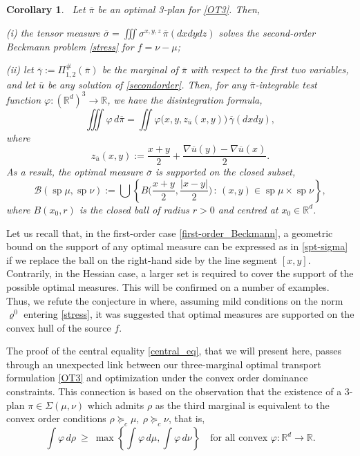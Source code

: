 \documentclass[11pt,letterpaper,reqno]{amsart}
\newtheorem{corollary}[theorem]{Corollary}
\theoremstyle{definition}
\numberwithin{equation}{section}
\newcommand{\med}{\medskip\noindent}
\newcommand{\R}{\mathbb{R}}
\newcommand{\Rd}{\R^d}
\newcommand{\ov}{\overline}
\newcommand{\B}{\mathcal{B}}
\DeclareMathOperator{\spt}{sp}
\begin{document}
\begin{corollary}\label{coro1-intro}\  Let $\ov \pi$ be an optimal 3-plan for \eqref{OT3}. Then,

\med (i) the tensor measure $\ov\sigma = \iiint \sigma^{x,y,z} \, \ov\pi(dxdydz)$ solves the second-order Beckmann problem \eqref{stress} for $f=\nu-\mu$;

\med (ii) let {$\ov\gamma:= \Pi_{1,2}^\#(\ov{\pi})$} be the marginal of $\ov\pi$ with respect to the first two variables, and let $\ov u$
be any solution of \eqref{secondorder}. Then, for any {$\ov\pi$-integrable} test function $\varphi: (\Rd)^3\to \R$,  we have the disintegration formula,
$$  \iiint \varphi \,  d\ov\pi =  \iint \varphi\big(x,y, z_{\ov u}(x,y)\big) \, \ov\gamma(dxdy),$$
where
\begin{equation}\label{zbar}
  z_{\ov u}(x,y) := \frac{x+y}{2} + \frac{\nabla \ov u(y)-\nabla \ov u(x)}{2}.
  \end{equation}
  As a result, the optimal measure $\ov\sigma$ is supported on the closed subset,
  \begin{equation}\label{spt-sigma}
\B(\spt \mu, \spt \nu) := \bigcup \left\{ B\Big(\frac{x+y}{2}, \frac{|x-y|}{2}\Big)\,:\, (x,y)\in \spt\mu \times \spt \nu\right\},
  \end{equation}
  where $B(x_0,r)$ is the closed ball of radius $r>0$ and centred at $x_0\in \Rd$.
  
\end{corollary}


Let us recall that, in the first-order case \eqref{first-order_Beckmann}, a geometric bound on the support of any optimal measure can be expressed as in  \eqref{spt-sigma} if we replace the ball on the right-hand side by the line segment $[x,y]$. Contrarily, in the Hessian case, a larger set is required  to cover the support of the possible optimal measures. This will be confirmed on a number of examples.
 Thus, we refute the conjecture in  \cite{bouchitte2007} where, assuming mild conditions on the norm $\varrho^0$ entering \eqref{stress}, it was suggested that optimal measures are supported on the convex hull of the source $f$.
 
 The proof  of the central equality \eqref{central_eq}, that we will present here,  passes through an unexpected link between our three-marginal optimal transport formulation \eqref{OT3} and optimization under the convex order dominance constraints. This connection is based on the observation that  the existence of a 3-plan $\pi\in \Sigma(\mu,\nu)$ which admits  $\rho$ as the third marginal
is equivalent to the convex order conditions $\rho \succeq_c \mu,\ \rho \succeq_c \nu$, that is,
\begin{equation}
	\int \varphi \,d\rho\ \geq \ \max \left\{ \int \varphi \,d\mu , \int\varphi \, d\nu\right\} \quad \text{for all convex \ $\varphi:\R^d \to \R$}.
\end{equation}
 
\end{document}
